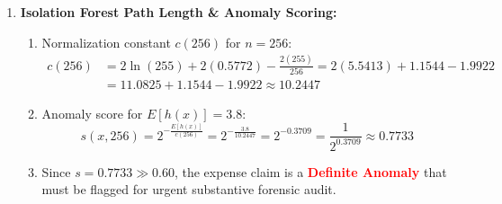 \begin{enumerate}[label=\textbf{P9.\arabic*}]
\begin{enumerate}[label=(\alph*)]
        \begin{align*}
        \mathcal{L}_{\text{Alpha}} &= (25{,}000 \times 1{,}000) + (50 \times 0) = \mathbf{Rs.~} 2{,}50{,}00{,}000\text{ (Rs.~2.5 Crores)} \\
        \mathcal{L}_{\text{Beta}} &= (25{,}000 \times 200) + (50 \times 4{,}200) = 50{,}00{,}000 + 2{,}10{,}000 = \mathbf{Rs.~} 52{,}10{,}000\text{ (Rs.~52.1 Lakhs)}
        \end{align*}
        \item Model Beta saves the enterprise Rs.~$1.98$ Crores in financial fraud losses ($79.2\%$ cost reduction). Model Alpha's high accuracy ($99.9\%$) is completely meaningless because it allows $100\%$ of fraud to escape.
    \end{enumerate}

    \item \textbf{Isolation Forest Path Length \& Anomaly Scoring:}
    \begin{enumerate}[label=(\alph*)]
        \item Normalization constant $c(256)$ for $n = 256$:
        \begin{align*}
        c(256) &= 2 \ln(255) + 2(0.5772) - \frac{2(255)}{256} = 2(5.5413) + 1.1544 - 1.9922 \\
        &= 11.0825 + 1.1544 - 1.9922 \approx \mathbf{10.2447}
        \end{align*}
        \item Anomaly score for $E[h(x)] = 3.8$:
        \begin{equation*}
        s(x, 256) = 2^{-\frac{E[h(x)]}{c(256)}} = 2^{-\frac{3.8}{10.2447}} = 2^{-0.3709} = \frac{1}{2^{0.3709}} \approx \mathbf{0.7733}
        \end{equation*}
        \item Since $s = 0.7733 \gg 0.60$, the expense claim is a \textcolor{red}{\textbf{Definite Anomaly}} that must be flagged for urgent substantive forensic audit.
    \end{enumerate}


\end{enumerate}
